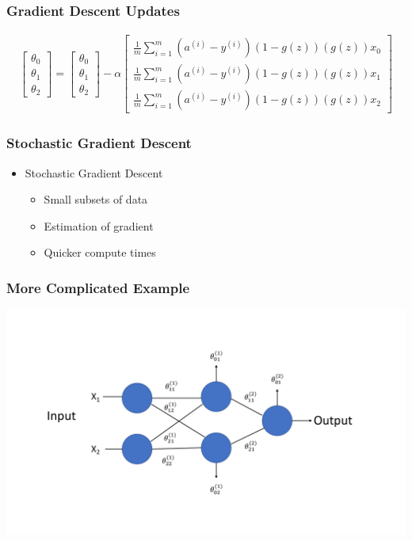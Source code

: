 \documentclass{beamer}
\begin{document}
\begin{frame}
    \frametitle{Gradient Descent Updates}

        \begin{align*}
            \begin{bmatrix}
                \theta_0 \\
                \theta_1 \\
                \theta_2 
            \end{bmatrix} = 
            \begin{bmatrix}
                \theta_0\\
                \theta_1\\
                \theta_2
            \end{bmatrix} - 
            \alpha
            \begin{bmatrix}
                \frac{1}{m} \sum_{i=1}^m (a^{(i)} - y^{(i)})(1-g(z))(g(z))x_0\\
                \frac{1}{m} \sum_{i=1}^m (a^{(i)} - y^{(i)})(1-g(z))(g(z))x_1\\
                \frac{1}{m} \sum_{i=1}^m (a^{(i)} - y^{(i)})(1-g(z))(g(z))x_2
            \end{bmatrix}
        \end{align*}

\end{frame}

\begin{frame}
    \frametitle{Stochastic Gradient Descent}

    \begin{itemize}
        \item Stochastic Gradient Descent
        \begin{itemize}[<+->]
            \item Small subsets of data
            \item Estimation of gradient 
            \item Quicker compute times
        \end{itemize}
    \end{itemize}

\end{frame}

\begin{frame}
    \frametitle{More Complicated Example}
    \includegraphics[scale = .3]{FIG2.pdf}\\
\end{frame}
\end{document}
